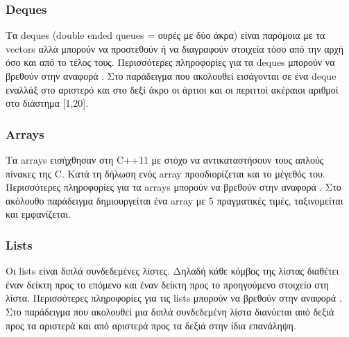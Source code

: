 




\subsubsection{Deques}
Τα deques (double ended queues = ουρές με δύο άκρα) είναι παρόμοια με τα vectors αλλά μπορούν να προστεθούν ή να διαγραφούν στοιχεία τόσο από την αρχή όσο και από το τέλος τους. Περισσότερες πληροφορίες για τα deques μπορούν να βρεθούν στην αναφορά \cite{g4gdeque}. Στο παράδειγμα που ακολουθεί εισάγονται σε ένα deque εναλλάξ στο αριστερό και στο δεξί άκρο οι άρτιοι και οι περιττοί ακέραιοι αριθμοί στο διάστημα [1,20].






\subsubsection{Arrays}
Τα arrays εισήχθησαν στη C++11 με στόχο να αντικαταστήσουν τους απλούς πίνακες της C. Κατά τη δήλωση ενός array προσδιορίζεται και το μέγεθός του. Περισσότερες πληροφορίες για τα arrays μπορούν να βρεθούν στην αναφορά \cite{g4garray}. Στο ακόλουθο παράδειγμα δημιουργείται ένα array με 5 πραγματικές τιμές, ταξινομείται και εμφανίζεται.






\subsubsection{Lists}
Οι lists είναι διπλά συνδεδεμένες λίστες. Δηλαδή κάθε κόμβος της λίστας διαθέτει έναν δείκτη προς το επόμενο και έναν δείκτη προς το προηγούμενο στοιχείο στη λίστα. Περισσότερες πληροφορίες για τις lists μπορούν να βρεθούν στην αναφορά \cite{g4glist}. Στο παράδειγμα που ακολουθεί μια διπλά συνδεδεμένη λίστα διανύεται από δεξιά προς τα αριστερά και από αριστερά προς τα δεξιά στην ίδια επανάληψη.







